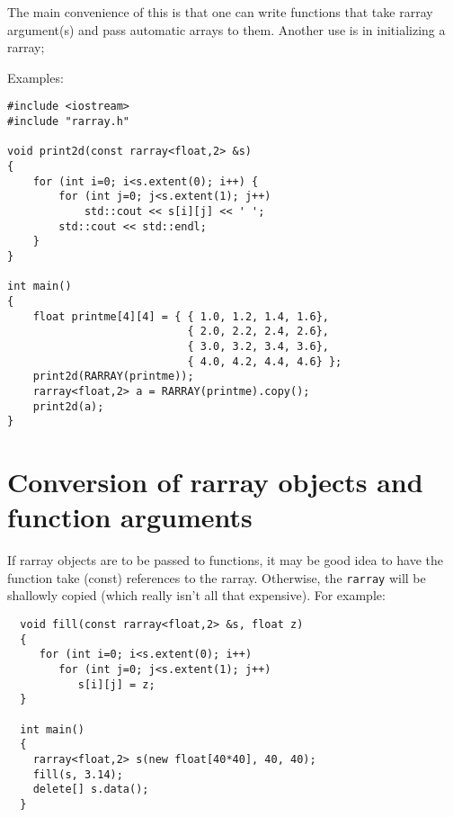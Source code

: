 \documentclass[12pt,twoside]{article}
\begin{document}
The main convenience of this is that one can write functions that take rarray argument(s) and pass automatic arrays to them. Another use is in initializing a rarray;

Examples:
\vspace{-5pt}\begin{framed}\vspace{-14pt}%
\begin{verbatim}
#include <iostream>
#include "rarray.h"

void print2d(const rarray<float,2> &s) 
{
    for (int i=0; i<s.extent(0); i++) {
        for (int j=0; j<s.extent(1); j++)
            std::cout << s[i][j] << ' ';
        std::cout << std::endl;
    }
}

int main() 
{
    float printme[4][4] = { { 1.0, 1.2, 1.4, 1.6},
                            { 2.0, 2.2, 2.4, 2.6},
                            { 3.0, 3.2, 3.4, 3.6},
                            { 4.0, 4.2, 4.4, 4.6} };
    print2d(RARRAY(printme));
    rarray<float,2> a = RARRAY(printme).copy();
    print2d(a);
}
\end{verbatim}
\vspace{-14pt}\end{framed}\vspace{-8pt}



\section{Conversion of rarray objects and function arguments}

If rarray objects are to be passed to functions, it may be good idea to have the function take (const) references to the rarray. Otherwise, the \texttt{rarray} will be shallowly copied (which really isn't all that expensive).  For example:
\vspace{-5pt}\begin{framed}\vspace{-14pt}%
\begin{verbatim}
  void fill(const rarray<float,2> &s, float z) 
  {
     for (int i=0; i<s.extent(0); i++)
        for (int j=0; j<s.extent(1); j++)
           s[i][j] = z;
  }

  int main() 
  {
    rarray<float,2> s(new float[40*40], 40, 40);
    fill(s, 3.14);
    delete[] s.data();
  }
\end{verbatim}
\vspace{-14pt}\end{framed}\vspace{-8pt}
\end{document}
